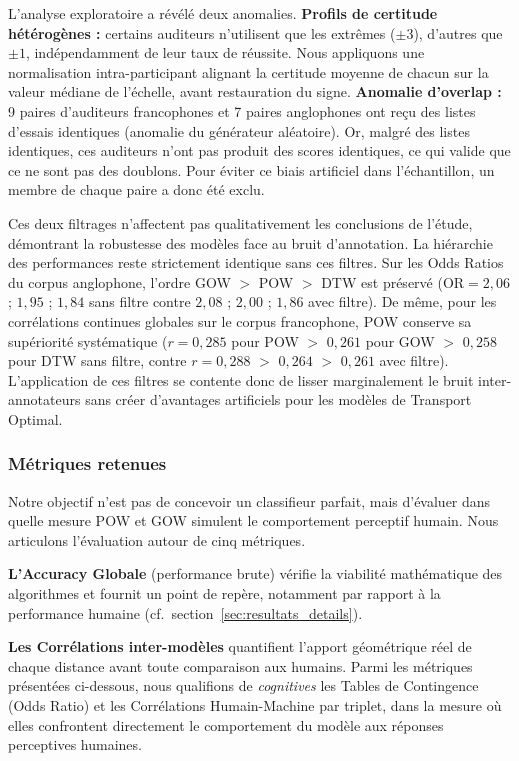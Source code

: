 \documentclass{article}
\begin{document}
L'analyse exploratoire a révélé deux anomalies. \textbf{Profils de certitude
hétérogènes :} certains auditeurs n'utilisent que les extrêmes ($\pm3$),
d'autres que $\pm1$, indépendamment de leur taux de réussite. Nous
appliquons une normalisation intra-participant alignant la certitude moyenne
de chacun sur la valeur médiane de l'échelle, avant restauration du signe.
\textbf{Anomalie d'overlap :} 9 paires d'auditeurs francophones et 7 paires
anglophones ont reçu des listes d'essais identiques (anomalie du générateur
aléatoire). Or, malgré des listes identiques, ces auditeurs n'ont pas produit
des scores identiques, ce qui valide que ce ne sont pas des doublons. 
Pour éviter ce biais artificiel dans l'échantillon, un membre de chaque paire a donc été exclu.

Ces deux filtrages n'affectent pas qualitativement les conclusions de l'étude,
démontrant la robustesse des modèles face au bruit d'annotation. 
La hiérarchie des performances reste strictement identique sans ces filtres. 
Sur les Odds Ratios du corpus anglophone, l'ordre GOW $>$ POW $>$ DTW est
préservé ($\text{OR} = 2{,}06$ ; $1{,}95$ ; $1{,}84$ sans filtre contre
$2{,}08$ ; $2{,}00$ ; $1{,}86$ avec filtre). De même, pour les corrélations
continues globales sur le corpus francophone, POW conserve sa supériorité
systématique ($r = 0{,}285$ pour POW $>$ $0{,}261$ pour GOW $>$ $0{,}258$
pour DTW sans filtre, contre $r = 0{,}288$ $>$ $0{,}264$ $>$ $0{,}261$ avec
filtre). L'application de ces filtres se contente donc de lisser marginalement
le bruit inter-annotateurs sans créer d'avantages artificiels pour
les modèles de Transport Optimal.

\subsubsection{Métriques retenues}
\label{sec:metriques_retenues}

Notre objectif n'est pas de concevoir un classifieur parfait, mais d'évaluer
dans quelle mesure POW et GOW simulent le comportement perceptif humain. Nous
articulons l'évaluation autour de cinq métriques.

\textbf{L'Accuracy Globale} (performance brute) vérifie la viabilité
mathématique des algorithmes et fournit un point de repère, notamment par
rapport à la performance humaine (cf.~section~\ref{sec:resultats_details}).

\textbf{Les Corrélations inter-modèles} quantifient l'apport géométrique
réel de chaque distance avant toute comparaison aux humains. Parmi les
métriques présentées ci-dessous, nous qualifions de \textit{cognitives} les
Tables de Contingence (Odds Ratio) et les Corrélations Humain-Machine par
triplet, dans la mesure où elles confrontent directement le
comportement du modèle aux réponses perceptives humaines.
\end{document}
